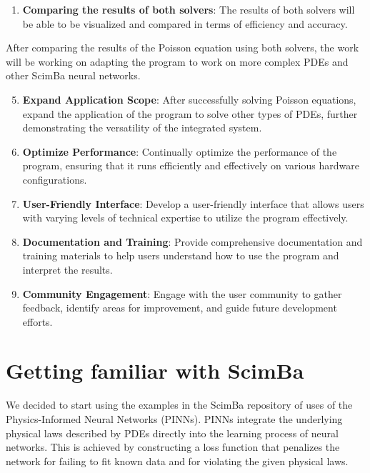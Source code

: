 \documentclass[12pt]{article}
\begin{document}
\begin{enumerate}
\begin{enumerate}
    \item \textbf{Comparing the results of both solvers}: The results of both solvers will be able to be visualized and compared in terms of efficiency and accuracy.
\end{enumerate}

After comparing the results of the Poisson equation using both solvers, the work will be working on adapting the program to work on more complex PDEs and other ScimBa neural networks.


\begin{enumerate}
    \setcounter{enumi}{4}
    \item \textbf{Expand Application Scope}: After successfully solving Poisson equations, expand the application of the program to solve other types of PDEs, further demonstrating the versatility of the integrated system.
    
    \item \textbf{Optimize Performance}: Continually optimize the performance of the program, ensuring that it runs efficiently and effectively on various hardware configurations.
    
    \item \textbf{User-Friendly Interface}: Develop a user-friendly interface that allows users with varying levels of technical expertise to utilize the program effectively.
    
    \item \textbf{Documentation and Training}: Provide comprehensive documentation and training materials to help users understand how to use the program and interpret the results.
    
    \item \textbf{Community Engagement}: Engage with the user community to gather feedback, identify areas for improvement, and guide future development efforts.
\end{enumerate}



\newpage

\section{Getting familiar with ScimBa}

We decided to start using the examples in the ScimBa repository of uses of the Physics-Informed Neural Networks (PINNs). PINNs integrate the underlying physical laws described by PDEs directly into the learning process of neural networks. This is achieved by constructing a loss function that penalizes the network for failing to fit known data and for violating the given physical laws.


\end{enumerate}
\end{document}
